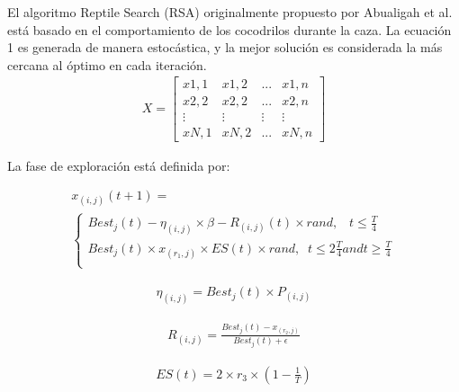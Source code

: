 \documentclass[conference]{IEEEtran}
\begin{document}
\noindent El algoritmo Reptile Search (RSA) originalmente propuesto por Abualigah et al.~\cite{Abualigah2022} está basado en el comportamiento de los cocodrilos durante la caza. 
\noindent La ecuación 1 es generada de manera estocástica, y la mejor solución es considerada la más cercana al óptimo en cada iteración.
\begin{equation}
\begin{gathered}
X= \begin{bmatrix}
  x1,1 & x1,2 & ... & x1,n  \\
  x2,2 & x2,2 & ... & x2,n  \\
  \vdots & \vdots & \vdots & \vdots \\
  xN,1 & xN,2 & ... & xN,n
\end{bmatrix}
\end{gathered}
\label{eq33}
\end{equation}

\noindent La fase de exploración está definida por:

\begin{equation}
\begin{gathered}
x_{(i,j)}(t+1)=\\
\begin{cases}
Best_j (t) - \eta_{(i,j)}\times \beta-R_{(i,j)}(t)\times rand, \; \; \; t \leq \frac{T}{4} \\
Best_j (t) \times x_{(r_1,j)} \times ES(t) \times rand, \; \; t \leq 2\frac{T}{4} and t \geq \frac{T}{4} \\
\end{cases}
\end{gathered}
\label{eq34}
\end{equation}   

\begin{equation}
\begin{gathered}
\eta_{(i,j)}=Best_j(t)\times P_{(i,j)}
\end{gathered}
\label{eq35}
\end{equation}

\begin{equation}
\begin{gathered}
R_{(i,j)}=\frac{Best_j(t) - x_{(r_2,j)}}{Best_j(t) +\epsilon}
\end{gathered}
\label{eq36}
\end{equation}

\begin{equation}
\begin{gathered}
ES(t)=2 \times r_3 \times (1 - \frac{1}{T})
\end{gathered}
\label{eq37}
\end{equation}
\end{document}
